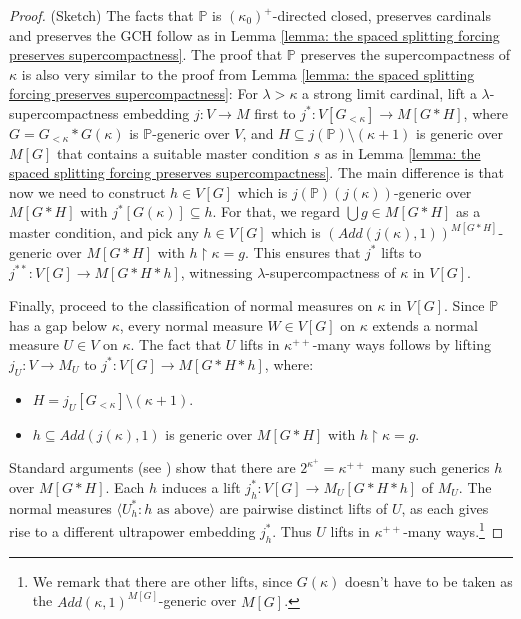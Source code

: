 \documentclass[11pt]{amsart}
\renewcommand{\restriction}{\mathbin\upharpoonright}    %
\theoremstyle{definition}
\newcounter{condition}
\theoremstyle{remark}
\newcommand\<{{<}}
\newcommand{\po}{\mathbb{P}}
\newcommand{\la}{\langle}
\newcommand{\ra}{\rangle}
\begin{document}
    \begin{proof}(Sketch)
        The facts that $\po$ is $(\kappa_0)^+$-directed closed, preserves cardinals and preserves the GCH follow as in Lemma \ref{lemma: the spaced splitting forcing preserves supercompactness}. The proof that $\po$ preserves the supercompactness of $\kappa$ is also very similar to the proof from Lemma \ref{lemma: the spaced splitting forcing preserves supercompactness}: For $\lambda>\kappa$ a strong limit cardinal, lift a $\lambda$-supercompactness embedding $j\colon V\to M$ first to  
        $j^*\colon V[G_{<\kappa}]\to M[G*H]$, where $G = G_{<\kappa}*G(\kappa)$ is $\po$-generic over $V$, and $H\subseteq j(\po)\setminus (\kappa+1)$ is generic over $M[G]$ that contains a suitable master condition $s$ as in Lemma \ref{lemma: the spaced splitting forcing preserves supercompactness}. The main difference is that now we need to construct $h\in V[G]$ which is $j(\po)(j(\kappa))$-generic over $M[G*H]$ with $j^*[G(\kappa)]\subseteq h$. For that, we regard $\bigcup g\in M[G*H]$ as a master condition, and pick any $h\in V[G]$ which is $(Add(j(\kappa),1))^{M[G*H]}$-generic over $M[G*H]$ with $h\restriction \kappa = g$. This ensures that $j^*$ lifts to $j^{**}\colon V[G]\to M[G*H*h]$, witnessing $\lambda$-supercompactness of $\kappa$ in $V[G]$.

        Finally, proceed to the classification of normal measures on $\kappa$ in $V[G]$. Since $\po$ has a gap below $\kappa$, every normal measure $W\in V[G]$ on $\kappa$ extends a normal measure $U\in V$ on $\kappa$. The fact that $U$ lifts in $\kappa^{++}$-many ways follows by lifting $j_U\colon V\to M_U$ to $j^* \colon V[G]\to M[G*H*h]$, where:
        \begin{itemize}
            \item $H = j_U[G_{<\kappa}]\setminus (\kappa+1)$.
            \item $h\subseteq Add(j(\kappa), 1)$ is generic over $M[G*H]$ with $h\restriction \kappa = g$. 
        \end{itemize}
        Standard arguments (see  \cite[Proposition 8.1]{CummingsHandbook}) show that there are $2^{\kappa^+} = \kappa^{++}$ many such generics $h$ over $M[G*H]$. Each $h$ induces a lift $j^*_h \colon V[G]\to M_U[G*H*h]$ of $M_U$. The normal measures $\la U^*_h \colon h \text{ as above} \ra$ are pairwise distinct lifts of $U$, as each gives rise to a different ultrapower embedding $j^*_h$. Thus $U$ lifts in $\kappa^{++}$-many ways.\footnote{We remark that there are other lifts, since $G(\kappa)$ doesn't have to be taken as the $Add(\kappa, 1)^{M[G]}$-generic over $M[G]$.}
    \end{proof}
    
\end{document}
